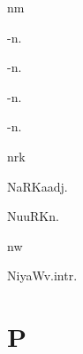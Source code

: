 \begin{multicols*}{2}
\begin{dictroot}{n}{m}
\begin{dictentry}{-}{n.}
    \end{dictentry}
    \begin{dictentry}{-}{n.}
    \end{dictentry}
    \begin{dictentry}{-}{n.}
    \end{dictentry}
    \begin{dictentry}{-}{n.}
    \end{dictentry}
\end{dictroot}

\begin{dictroot}{n}{rk}
    \begin{dictentry}{NaRKa}{adj.}
    \end{dictentry}
    \begin{dictentry}{NuuRK}{n.}
    \end{dictentry}
\end{dictroot}

\begin{dictroot}{n}{w}
    \begin{dictentry}{NiyaW}{v.intr.}
    \end{dictentry}
\end{dictroot}

\section*{P}


\end{multicols*}
